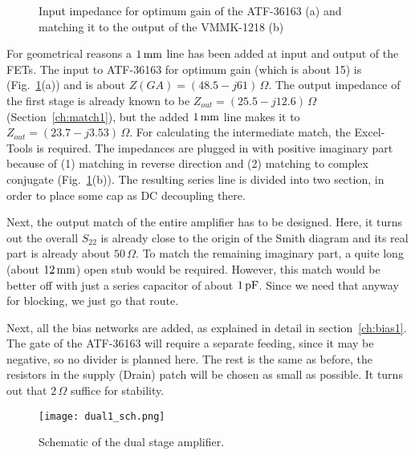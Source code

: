 \begin{figure}
  \centering
  \caption{Input impedance for optimum gain of the ATF-36163 (a) and
    matching it to the output of the VMMK-1218 (b)}
  \label{fig:atf36163_input}
\end{figure}

For geometrical reasons a $1\,\mathrm{mm}$ line has been added at input
and output of the FETs.  The input to ATF-36163 for optimum gain
(which is about 15) is (Fig.~\ref{fig:atf36163_input}(a)) and is about
$Z(GA)=(48.5-j61)\,\Omega$.  The output impedance of the first stage
is already known to be $Z_{out}=(25.5-j12.6)\,\Omega$
(Section~\ref{ch:match1}), but the added $1\,\mathrm{mm}$ line makes it
to $Z_{out}=(23.7-j3.53)\,\Omega$. For calculating the intermediate
match, the Excel-Tools is required. The impedances are plugged in with
positive imaginary part because of (1) matching in reverse direction
and (2) matching to complex conjugate
(Fig.~\ref{fig:atf36163_input}(b)). The resulting series line is
divided into two section, in order to place some cap as DC decoupling
there.

Next, the output match of the entire amplifier has to be
designed. Here, it turns out the overall $S_{22}$ is already close to
the origin of the Smith diagram and its real part is already about
$50\,\Omega$. To match the remaining imaginary part, a quite long
(about $12\,\mathrm{mm}$) open stub would be required. However, this
match would be better off with just a series capacitor of about
$1\,\mathrm{pF}$. Since we need that anyway for blocking, we just go that
route. 


Next, all the bias networks are added, as explained in detail in
section~\ref{ch:bias1}. The gate of the ATF-36163 will require a
separate feeding, since it may be negative, so no divider is planned
here. The rest is the same as before, the resistors in the supply
(Drain) patch will be chosen as small as possible. It turns out that
$2\,\Omega$ suffice for stability.

\begin{figure}
  \centering
  {\texttt{[image: dual1\_sch.png]}}
  \caption{Schematic of the dual stage amplifier.}
  \label{fig:dual1_sch}
\end{figure}


